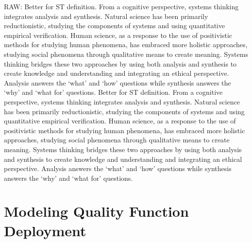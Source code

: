 RAW:
Better for ST definition. From a cognitive perspective, systems thinking integrates analysis and synthesis. Natural science has been primarily reductionistic, studying the components of systems and using quantitative empirical verification. Human science, as a response to the use of positivistic methods for studying human phenomena, has embraced more holistic approaches, studying social phenomena through qualitative means to create meaning. Systems thinking bridges these two approaches by using both analysis and synthesis to create knowledge and understanding and integrating an ethical perspective. Analysis answers the ‘what’ and ‘how’ questions while synthesis answers the ‘why’ and ‘what for’ questions. Better for ST definition. From a cognitive perspective, systems thinking integrates analysis and synthesis. Natural science has been primarily reductionistic, studying the components of systems and using quantitative empirical verification. Human science, as a response to the use of positivistic methods for studying human phenomena, has embraced more holistic approaches, studying social phenomena through qualitative means to create meaning. Systems thinking bridges these two approaches by using both analysis and synthesis to create knowledge and understanding and integrating an ethical perspective. Analysis answers the ‘what’ and ‘how’ questions while synthesis answers the ‘why’ and ‘what for’ questions.


\section{Modeling Quality Function Deployment}

